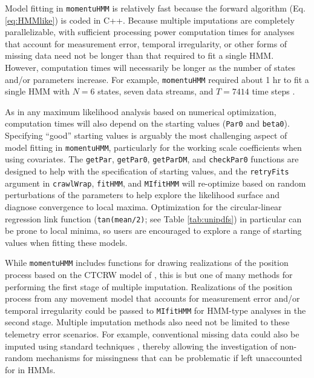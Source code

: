 \documentclass[12pt]{article}\usepackage[]{graphicx}\usepackage[]{xcolor}
\begin{document}
Model fitting in \verb|momentuHMM| is relatively fast because the forward algorithm (Eq. \ref{eq:HMMlike}) is coded in C++. Because multiple imputations are completely parallelizable, with sufficient processing power computation times for analyses that account for measurement error, temporal irregularity, or other forms of missing data need not be longer than that required to fit a single HMM.  However, computation times will necessarily be longer as the number of states and/or parameters increase. For example, \verb|momentuHMM| required about 1 hr to fit a single HMM with $N=6$ states, seven data streams, and $T=7414$ time steps \citep{McClintock2017}. 

As in any maximum likelihood analysis based on numerical optimization, computation times will also depend on the starting values (\verb|Par0| and \verb|beta0|). Specifying ``good'' starting values is arguably the most challenging aspect of model fitting in \verb|momentuHMM|, particularly for the working scale coefficients when using covariates. The \verb|getPar|, \verb|getPar0|, \verb|getParDM|, and \verb|checkPar0| functions are designed to help with the specification of starting values, and the \verb|retryFits| argument in \verb|crawlWrap|, \verb|fitHMM|, and \verb|MIfitHMM| will re-optimize based on random perturbations of the parameters to help explore the likelihood surface and diagnose convergence to local maxima. Optimization for the circular-linear regression link function (\verb|tan(mean/2)|; see Table \ref{tab:unipdfs}) in particular can be prone to local minima, so users are encouraged to explore a range of starting values when fitting these models.

While \verb|momentuHMM| includes functions for drawing realizations of the position process based on the CTCRW model of \cite{JohnsonEtAl2008}, this is but one of many methods for performing the first stage of multiple imputation. Realizations of the position process from any movement model that accounts for measurement error and/or temporal irregularity \citep[e.g.][]{CalabreseEtAl2016,GurarieEtAl2017} could be passed to \verb|MIfitHMM| for HMM-type analyses in the second stage. Multiple imputation methods also need not be limited to these telemetry error scenarios. For example, conventional missing data could also be imputed using standard techniques \citep{RubinSchenker1986}, thereby allowing the investigation of non-random mechanisms for missingness that can be problematic if left unaccounted for in HMMs.
\end{document}
